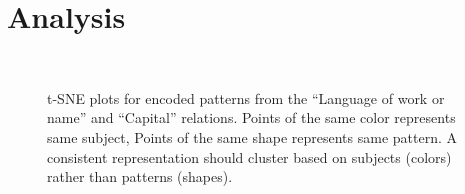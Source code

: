 \section{Analysis}
\label{sec:analysis}



\begin{figure}[t!]
\centering

\\
{}


\caption{t-SNE plots for encoded patterns from the ``Language of work or name'' and ``Capital'' relations. Points of the same color represents same subject, Points of the same shape represents same pattern. A consistent representation should cluster based on subjects (colors) rather than patterns (shapes).}
\label{fig:tsne-emb}

\end{figure}

